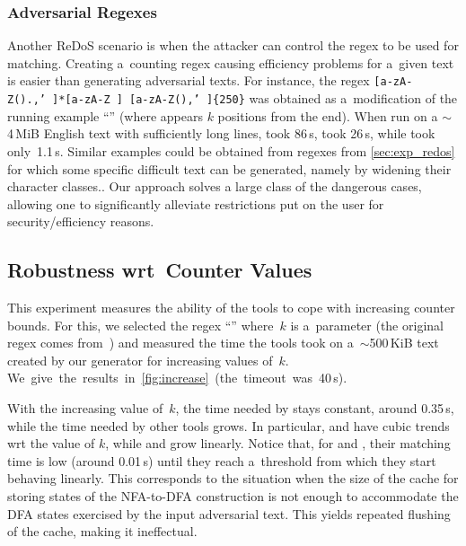 \documentclass[acmsmall,screen]{acmart}
\begin{document}
\subsubsection{Adversarial Regexes}
\vspace{-0.0mm}
Another ReDoS scenario is when the attacker can control the regex to be used for
matching.
%
Creating a~counting regex causing efficiency problems for a~given text
is easier than generating adversarial texts.
For instance, the regex
\texttt{[a-zA-Z().,'\ ]*[a-zA-Z\ ] [a-zA-Z()\.,'\ ]\{250\}} was obtained as
a~modification of the running example ``'' (where  appears
$k$ positions from the end).
When run on a $\sim$4\,MiB English text with sufficiently long lines,
\retwo took 86\,s, \grep took 26\,s, while \catool took only~1.1\,s.
Similar examples could be obtained from regexes from \cref{sec:exp_redos} for which some specific difficult text can be generated, namely by widening their character classes.. 
Our approach solves a large class of the dangerous cases,
allowing one to significantly alleviate restrictions put on the user for 
security/efficiency reasons.

\vspace{-1.0mm}
\subsection{Robustness wrt\ Counter Values}\label{sec:label}
\vspace{-0.5mm}
\enlargethispage{2mm}


\interestingtable
This experiment measures the ability of the tools to cope with
increasing counter bounds.
For this, we selected the regex ``'' where~$k$ is a~parameter
(the original regex  comes from~\cite{DavisMCSL19})
and measured the time the tools took on a~$\sim$500\,KiB text created by our
generator for increasing values of~$k$.
\mbox{We give the results in \cref{fig:increase} (the timeout was 40\,s).}

With the increasing value of~$k$, the time needed by \catool stays constant,
around 0.35\,s,
while the time needed by other tools grows.
In particular, \dotnet and \srm have cubic trends wrt the value of
$k$, while \retwo and \grep grow linearly.
Notice that, for \retwo and \grep, their matching time is low (around 0.01\,s)
until they reach a~threshold from which they start behaving linearly.
This corresponds to the situation when the size of the cache for storing states
of the NFA-to-DFA construction is not enough to accommodate the DFA states
exercised by the input adversarial text.
This yields repeated flushing of the cache, making it ineffectual.
\end{document}
